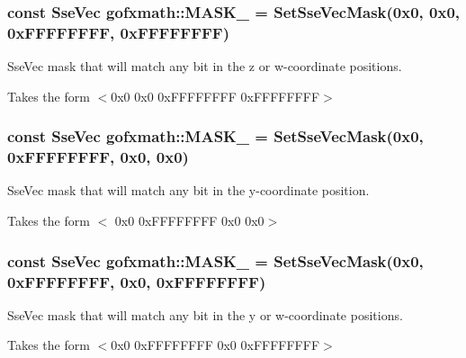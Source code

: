 \subsubsection[{M\+A\+S\+K\+\_\+0011}]{\setlength{\rightskip}{0pt plus 5cm}const {\bf Sse\+Vec} gofxmath\+::\+M\+A\+S\+K\+\_ = {\bf Set\+Sse\+Vec\+Mask}(0x0, 0x0, 0x\+F\+F\+F\+F\+F\+F\+F\+F, 0x\+F\+F\+F\+F\+F\+F\+F\+F)}\label{namespacegofxmath_ab4d2ad1ff23d4e35a2cb19a3be6dbe19}


Sse\+Vec mask that will match any bit in the z or w-\/coordinate positions. 

Takes the form $<$0x0 0x0 0x\+F\+F\+F\+F\+F\+F\+F\+F 0x\+F\+F\+F\+F\+F\+F\+F\+F$>$ \hypertarget{namespacegofxmath_a8cdc76e209aa891f09b886c3f00fa7ba}{}
\subsubsection[{M\+A\+S\+K\+\_\+0100}]{\setlength{\rightskip}{0pt plus 5cm}const {\bf Sse\+Vec} gofxmath\+::\+M\+A\+S\+K\+\_ = {\bf Set\+Sse\+Vec\+Mask}(0x0, 0x\+F\+F\+F\+F\+F\+F\+F\+F, 0x0, 0x0)}\label{namespacegofxmath_a8cdc76e209aa891f09b886c3f00fa7ba}


Sse\+Vec mask that will match any bit in the y-\/coordinate position. 

Takes the form $<$ 0x0 0x\+F\+F\+F\+F\+F\+F\+F\+F 0x0 0x0$>$ \hypertarget{namespacegofxmath_a64d1694904be595e301c48b51810b43d}{}
\subsubsection[{M\+A\+S\+K\+\_\+0101}]{\setlength{\rightskip}{0pt plus 5cm}const {\bf Sse\+Vec} gofxmath\+::\+M\+A\+S\+K\+\_ = {\bf Set\+Sse\+Vec\+Mask}(0x0, 0x\+F\+F\+F\+F\+F\+F\+F\+F, 0x0, 0x\+F\+F\+F\+F\+F\+F\+F\+F)}\label{namespacegofxmath_a64d1694904be595e301c48b51810b43d}


Sse\+Vec mask that will match any bit in the y or w-\/coordinate positions. 

Takes the form $<$0x0 0x\+F\+F\+F\+F\+F\+F\+F\+F 0x0 0x\+F\+F\+F\+F\+F\+F\+F\+F$>$ \hypertarget{namespacegofxmath_af23b97e8acce0ac2474bef3510e8dea3}{}
